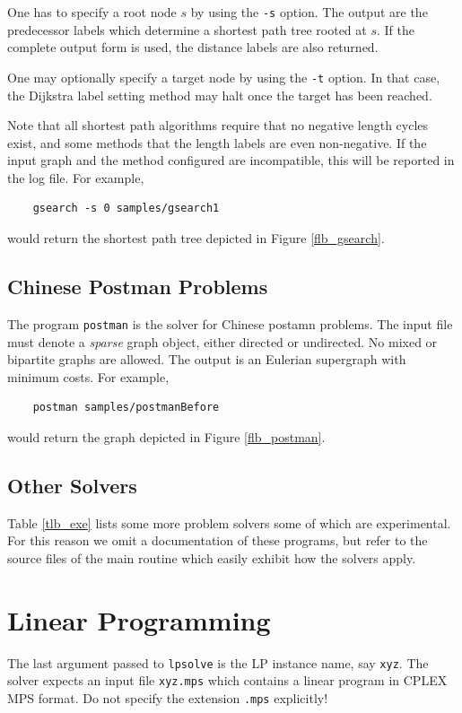 \documentclass[a4paper,11pt,twoside]{book}
\begin{document}
\begin{multicols}{2}
One has to specify a root node $s$ by using the \verb/-s/ option. The output
are the predecessor labels which determine a shortest path tree rooted at $s$.
If the complete output form is used, the distance labels are also returned.

One may optionally specify a target node by using the \verb/-t/ option. In that
case, the Dijkstra label setting method may halt once the target has been
reached.

Note that all shortest path algorithms require that no negative length cycles
exist, and some methods that the length labels are even non-negative. If the
input graph and the method configured are incompatible, this will be reported
in the log file. For example,
\begin{verbatim}
    gsearch -s 0 samples/gsearch1
\end{verbatim}
would return the shortest path tree depicted in Figure \ref{flb_gsearch}.


\subsection{Chinese Postman Problems}
The program \verb/postman/ is the solver for Chinese postamn problems. The input
file must denote a {\it sparse} graph object, either directed or undirected. No
mixed or bipartite graphs are allowed. The output is an Eulerian supergraph
with minimum costs. For example,
\begin{verbatim}
    postman samples/postmanBefore
\end{verbatim}
would return the graph depicted in Figure \ref{flb_postman}.


\subsection{Other Solvers}
Table \ref{tlb_exe} lists some more problem solvers some of which are
experimental. For this reason we omit a documentation of these programs, but
refer to the source files of the main routine which easily exhibit how
the solvers apply.



\section{Linear Programming}
The last argument passed to \verb/lpsolve/ is the LP instance name, say
\verb/xyz/. The solver expects an input file \verb/xyz.mps/ which contains
a linear program in CPLEX MPS format. Do not specify the extension \verb/.mps/
explicitly!


\end{multicols}
\end{document}
